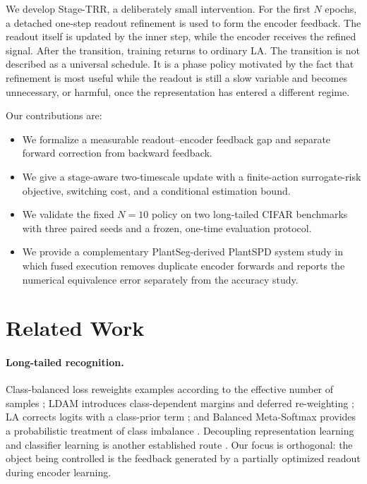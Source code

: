 \documentclass[10pt,letterpaper]{article}
\newcommand{\method}{Stage-TRR}
\begin{document}
We develop \method, a deliberately small intervention. For the first $N$ epochs, a detached one-step readout refinement is used to form the encoder feedback. The readout itself is updated by the inner step, while the encoder receives the refined signal. After the transition, training returns to ordinary LA. The transition is not described as a universal schedule. It is a phase policy motivated by the fact that refinement is most useful while the readout is still a slow variable and becomes unnecessary, or harmful, once the representation has entered a different regime.

Our contributions are:
\begin{itemize}
\item We formalize a measurable readout--encoder feedback gap and separate forward correction from backward feedback.
\item We give a stage-aware two-timescale update with a finite-action surrogate-risk objective, switching cost, and a conditional estimation bound.
\item We validate the fixed $N=10$ policy on two long-tailed CIFAR benchmarks with three paired seeds and a frozen, one-time evaluation protocol.
\item We provide a complementary PlantSeg-derived PlantSPD system study in which fused execution removes duplicate encoder forwards and reports the numerical equivalence error separately from the accuracy study.
\end{itemize}

\section{Related Work}
\paragraph{Long-tailed recognition.}
Class-balanced loss reweights examples according to the effective number of samples \citep{cui2019classbalanced}; LDAM introduces class-dependent margins and deferred re-weighting \citep{cao2019ldam}; LA corrects logits with a class-prior term \citep{menon2021longtail}; and Balanced Meta-Softmax provides a probabilistic treatment of class imbalance \citep{ren2020balanced}. Decoupling representation learning and classifier learning is another established route \citep{kang2020decoupling}. Our focus is orthogonal: the object being controlled is the feedback generated by a partially optimized readout during encoder learning.
\end{document}
